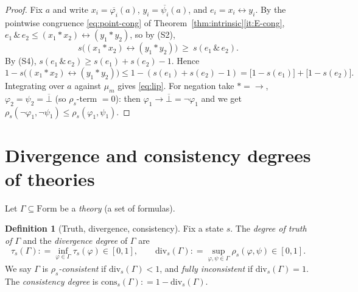 \documentclass{amsart}
\theoremstyle{definition}
\newtheorem{definition}{Definition}
\theoremstyle{plain}
\newcommand{\eqdef}{\mathrel{\mathop:}=}
\newcommand{\Form}{\mathrm{Form}}
\newcommand{\fto}{\rightarrow}
\newcommand{\fbi}{\leftrightarrow}
\newcommand{\odotop}{\,\&\,}
\newcommand{\Bot}{\bot}
\begin{document}
\begin{proof}
Fix $a$ and write $x_i=\overline{\varphi_i}(a)$, $y_i=\overline{\psi_i}(a)$, and
$e_i=x_i\fbi y_i$.  By the pointwise congruence \eqref{eq:point-cong} of
Theorem~\ref{thm:intrinsic}\eqref{it:E-cong},
$e_1\odotop e_2\le(x_1*x_2)\fbi(y_1*y_2)$, so by (S2),
\[
s\bigl((x_1*x_2)\fbi(y_1*y_2)\bigr)\ \ge\ s(e_1\odotop e_2).
\]
By (S4), $s(e_1\odotop e_2)\ge s(e_1)+s(e_2)-1$.  Hence
\[
1-s\bigl((x_1*x_2)\fbi(y_1*y_2)\bigr)
\le 1-(s(e_1)+s(e_2)-1)
=\bigl[1-s(e_1)\bigr]+\bigl[1-s(e_2)\bigr].
\]
Integrating over $a$ against $\mu_m$ gives \eqref{eq:lip}.  For negation take
$*=\fto$, $\varphi_2=\psi_2=\overline\Bot$ (so $\rho_s$-term $=0$): then
$\varphi_1\fto\overline\Bot=\neg\varphi_1$ and we get
$\rho_s(\neg\varphi_1,\neg\psi_1)\le\rho_s(\varphi_1,\psi_1)$.
\end{proof}

\section{Divergence and consistency degrees of theories}\label{sec:theories}

Let $\Gamma\subseteq\Form$ be a \emph{theory} (a set of formulas).

\begin{definition}[Truth, divergence, consistency]\label{def:cons}
Fix a state $s$.  The \emph{degree of truth of $\Gamma$} and the
\emph{divergence degree} of $\Gamma$ are
\begin{equation}\label{eq:cons}
\tau_s(\Gamma)\eqdef \inf_{\varphi\in\Gamma}\tau_s(\varphi)\in[0,1],
\qquad
\mathrm{div}_s(\Gamma)\eqdef\sup_{\varphi,\psi\in\Gamma}\rho_s(\varphi,\psi)\in[0,1].
\end{equation}
We say $\Gamma$ is \emph{$\rho_s$-consistent} if $\mathrm{div}_s(\Gamma)<1$, and
\emph{fully inconsistent} if $\mathrm{div}_s(\Gamma)=1$.  The
\emph{consistency degree} is $\mathrm{cons}_s(\Gamma)\eqdef 1-\mathrm{div}_s(\Gamma)$.
\end{definition}
\end{document}
